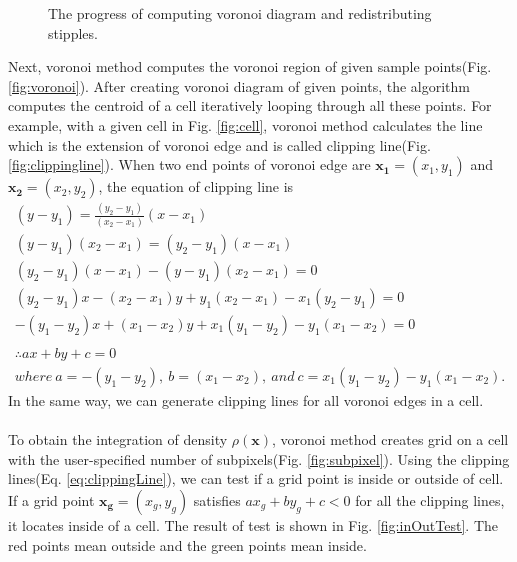 \documentclass[11pt]{article}
\begin{document}
\begin{figure}[thb]
{    \label{fig:inOutTest}
  }\hspace{-3mm}
  \hspace{-3mm}
    \caption{The progress of computing voronoi diagram and redistributing stipples. \label{fig:createVoronoi}}
\end{figure}
Next, voronoi method computes the voronoi region of given sample points(Fig. \ref{fig:voronoi}).
After creating voronoi diagram of given points, the algorithm computes the centroid of a cell iteratively looping through all these points.
For example, with a given cell in Fig. \ref{fig:cell}, voronoi method calculates the line which is the extension of voronoi edge and is called clipping line(Fig. \ref{fig:clippingline}).
When two end points of voronoi edge are $\mathbf{x_1}=(x_1,y_1)$ and $\mathbf{x_2}=(x_2,y_2)$, the equation of clipping line is
\begin{equation}\label{eq:clippingLine}
\begin{gathered}
(y-y_1) = \frac{(y_2-y_1)}{(x_2-x_1)}(x-x_1)\\
(y-y_1)(x_2-x_1) = (y_2-y_1)(x-x_1)\\
(y_2-y_1)(x-x_1)-(y-y_1)(x_2-x_1)= 0\\
(y_2-y_1)x-(x_2-x_1)y+y_1(x_2-x_1)-x_1(y_2-y_1)=0\\
-(y_1-y_2)x+(x_1-x_2)y+x_1(y_1-y_2)-y_1(x_1-x_2)=0\\\\
\therefore ax+by+c=0 \\where\:a=-(y_1-y_2),\:b=(x_1-x_2),\:and\:c=x_1(y_1-y_2)-y_1(x_1-x_2).
\end{gathered}
\end{equation}
In the same way, we can generate clipping lines for all voronoi edges in a cell.\\\\
To obtain the integration of density $\rho(\mathbf{x})$, voronoi method creates grid on a cell with the user-specified number of subpixels(Fig. \ref{fig:subpixel}).
Using the clipping lines(Eq. \ref{eq:clippingLine}), we can test if a grid point is inside or outside of cell. If a grid point $\mathbf{x_g}=(x_g, y_g)$ satisfies $ax_g+by_g+c<0$ for all the clipping lines, it locates inside of a cell. The result of test is shown in Fig. \ref{fig:inOutTest}. The red points mean outside and the green points mean inside.
\end{document}
